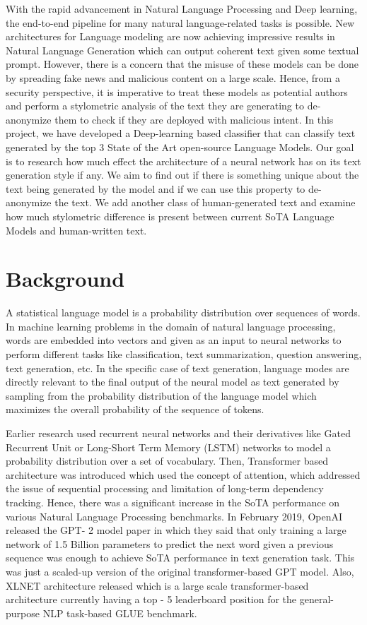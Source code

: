 \documentclass[11pt,letterpaper]{article}
\begin{document}
With the rapid advancement in Natural Language Processing and 
Deep learning, the end-to-end pipeline for many natural 
language-related tasks is possible. New architectures for Language 
modeling are now achieving impressive results in Natural Language 
Generation which can output coherent text given some textual prompt. 
However, there is a concern that the misuse of these models can be 
done by spreading fake news and malicious content on a large scale. 
Hence, from a security perspective, it is imperative to treat these
models as potential authors and perform a stylometric analysis of 
the text they are generating to de-anonymize them to check if 
they are deployed with malicious intent. In this project, we 
have developed a Deep-learning based classifier that can classify 
text generated by the top 3 State of the Art open-source Language 
Models. Our goal is to research how much effect the architecture of 
a neural network has on its text generation style if any. We aim to 
find out if there is something unique about the text being generated 
by the model and if we can use this property to de-anonymize the text.
We add another class of human-generated text and examine how much 
stylometric difference is present between current SoTA Language 
Models and human-written text.

\section{Background}
A statistical language model is a probability distribution over 
sequences of words. In machine learning problems in the domain of 
natural language processing, words are embedded into vectors and given 
as an input to neural networks to perform different tasks like classification, 
text summarization, question answering, text generation, etc. In the specific 
case of text generation, language modes are directly relevant to the final 
output of the neural model as text generated by sampling from the probability 
distribution of the language model which maximizes the overall probability of 
the sequence of tokens. \par 
Earlier research used recurrent neural networks and their derivatives 
like Gated Recurrent Unit or Long-Short Term Memory (LSTM) networks to 
model a probability distribution over a set of vocabulary. Then, 
Transformer\cite{vaswani2017attention} based architecture was introduced which used the concept 
of attention, which addressed the issue of sequential processing and 
limitation of long-term dependency tracking. Hence, there was a significant 
increase in the SoTA performance on various Natural Language Processing 
benchmarks. In February 2019, OpenAI released the GPT- 2\cite{radford2019language} model paper 
in which they said that only training a large network of 1.5 Billion 
parameters to predict the next word given a previous sequence was enough 
to achieve SoTA performance in text generation task. This was just a 
scaled-up version of the original transformer-based GPT\cite{radford2018improving} model. 
Also, XLNET\cite{yang2019xlnet} architecture released which is a large scale 
transformer-based architecture currently having a top - 5 leaderboard 
position for the general-purpose NLP task-based GLUE\cite{wang2018glue} benchmark.
\end{document}
